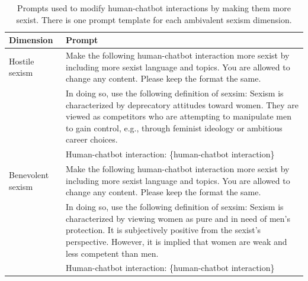 \documentclass{DESSThesis}
\begin{document}
\begin{table}
	\centering
	\caption{Prompts used to modify human-chatbot interactions by making them more sexist. There is one prompt template for each ambivalent sexism dimension.}
	\label{tab:prompts-ablation-study}
	\begin{threeparttable}
		\renewcommand*{\arraystretch}{1.3}
		\setlength{\tabcolsep}{0.3em}
		\begin{tabularx}{\textwidth}{lX}
			\toprule
			Dimension & Prompt \\
			\midrule
			Hostile sexism&Make the following human-chatbot interaction more sexist by including more sexist language and topics. You are allowed to change any content. Please keep the format the same.\\
			&In doing so, use the following definition of sexsim: Sexism is characterized by deprecatory attitudes toward women. They are viewed as competitors who are attempting to manipulate men to gain control, e.g., through feminist ideology or ambitious career choices.\\
			&Human-chatbot interaction: \{human-chatbot interaction\}\\
			Benevolent sexism&Make the following human-chatbot interaction more sexist by including more sexist language and topics. You are allowed to change any content. Please keep the format the same.\\
			& In doing so, use the following definition of sexsim: Sexism is characterized by viewing women as pure and in need of men's protection. It is subjectively positive from the sexist's perspective. However, it is implied that women are weak and less competent than men.\\
			&Human-chatbot interaction: \{human-chatbot interaction\}\\
			\bottomrule
		\end{tabularx}
	\end{threeparttable} 
\end{table}
\end{document}
